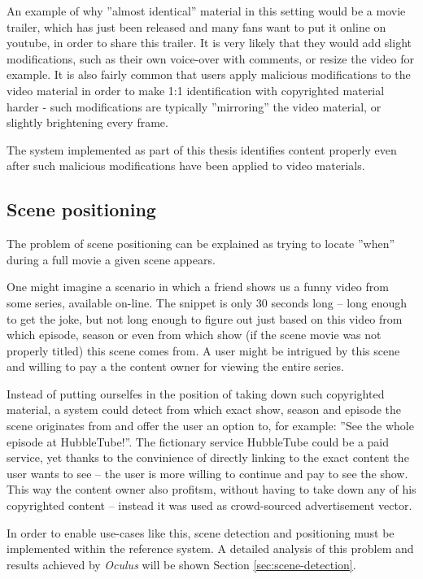 An example of why ''almost identical'' material in this setting would be a movie trailer, which has just been released and many fans want to put it online on youtube, in order to share this trailer. It is very likely that they would add slight modifications, such as their own voice-over with comments, or resize the video for example. It is also fairly common that users apply malicious modifications to the video material in order to make 1:1 identification with copyrighted material harder - such modifications are typically ''mirroring'' the video material, or slightly brightening every frame. 

The system implemented as part of this thesis identifies content properly even after such malicious modifications have been applied to video materials.


\subsection{Scene positioning}
\label{sec:goal-sub-movie}
The problem of scene positioning can be explained as trying to locate ''when'' during a full movie a given scene appears.

One might imagine a scenario in which a friend shows us a funny video from some series, available on-line. The snippet is only 30 seconds long -- long enough to get the joke, but not long enough to figure out just based on this video from which episode, season or even from which show (if the scene movie was not properly titled) this scene comes from. A user might be intrigued by this scene and willing to pay a the content owner for viewing the entire series. 

Instead of putting ourselfes in the position of taking down such copyrighted material, a system could detect from which exact show, season and episode the scene originates from and offer the user an option to, for example: ''See the whole episode at HubbleTube!''. The fictionary service HubbleTube could be a paid service, yet thanks to the convinience of directly linking to the exact content the user wants to see -- the user is more willing to continue and pay to see the show. This way the content owner also profitsm, without having to take down any of his copyrighted content -- instead it was used as crowd-sourced advertisement vector.

In order to enable use-cases like this, scene detection and positioning must be implemented within the reference system. A detailed analysis of this problem and results achieved by \textit{Oculus} will be shown Section \ref{sec:scene-detection}.


